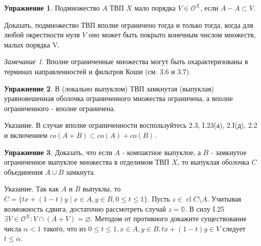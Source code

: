 \documentclass[a4paper, 12pt]{article}
\theoremstyle{definition}
\newtheorem{problem}{Упражнение}[section]
\theoremstyle{remark}
\newtheorem*{remark}{Замечание}
\DeclareMathOperator{\clo}{cl}
\begin{document}
\begin{problem}
    Подмножество $A$ ТВП $X$ мало порядка $V\in \mathcal O^X$, если $A-A\subset V$.
    
    Доказать, подмножество ТВП вполне ограничено тогда и только тогда, когда для любой окрестности нуля $V$ оно может быть покрыто конечным числом множеств, малых порядка V.
\end{problem}
\begin{remark}
    Вполне ограниченные множества могут быть охарактеризованы в терминах направленностей и фильтров Коши (см. 3.6 и 3.7).
\end{remark}
\begin{problem}
    В (локально выпуклом) ТВП замкнутая (выпуклая) уравновешенная оболочка ограниченного множества ограничена, а вполне ограниченного - вполне ограничена.

    Указание. В случае вполне ограниченности воспользуйтесь 2.3, I.23(а), 2.I(д), 2.2 и включением $co(A+B)\subset co(A)+ co(B)$.
\end{problem}
\begin{problem}
    Доказать, что если $A$ - компактное выпуклое, а $B$ - замкнутое ограниченное выпуклое множества в отделимом ТВП $X$, то выпуклая оболочка $C$ объединения $A\cup B$ замкнута.

    Указание. Так как $A$ и $B$ выпуклы, то $C = \{tx+ (1-t)y \;|\; x\in A, y\in B, 0\le t \le 1\}$. Пусть $z\in \clo C \setminus A$. Учитывая возможность сдвига, достаточно рассмотреть случай $z=\mathbb{0}$. В силу I.25 $\exists V\in \mathcal O^X : V\cap (A+V)=\varnothing$. Методом от противного докажите существование числа $\alpha < 1$ такого, что из $0\le t \le 1, x\in A, y\in B, tx+(1-t)y\in V$ следует $t\le\alpha$.
\end{problem}
\end{document}
